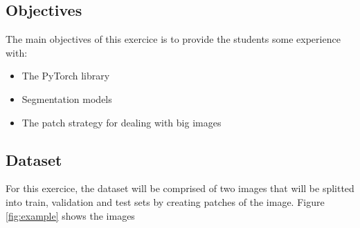 \documentclass[10pt, a4paper]{article}
\begin{document}
\subsection{Objectives}

The main objectives of this exercice is to provide the students some experience with:

\begin{itemize}
  \item The PyTorch library
  \item Segmentation models
  \item The patch strategy for dealing with big images
\end{itemize}

\subsection{Dataset}

For this exercice, the dataset will be comprised of two images that will be splitted into train, validation and test sets by creating patches of the image. Figure \ref{fig:example}
shows the images
\end{document}
